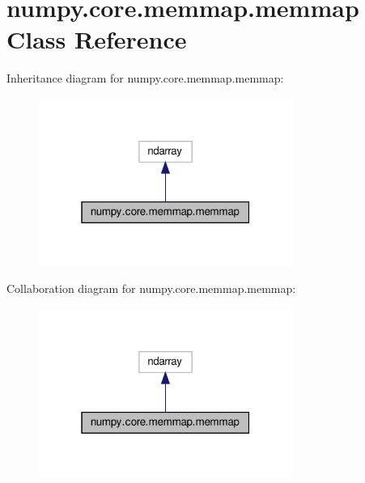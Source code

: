 \hypertarget{classnumpy_1_1core_1_1memmap_1_1memmap}{}\section{numpy.\+core.\+memmap.\+memmap Class Reference}
\label{classnumpy_1_1core_1_1memmap_1_1memmap}


Inheritance diagram for numpy.\+core.\+memmap.\+memmap\+:
\nopagebreak
\begin{figure}[H]
\begin{center}
\leavevmode
\includegraphics[width=235pt]{classnumpy_1_1core_1_1memmap_1_1memmap__inherit__graph}
\end{center}
\end{figure}


Collaboration diagram for numpy.\+core.\+memmap.\+memmap\+:
\nopagebreak
\begin{figure}[H]
\begin{center}
\leavevmode
\includegraphics[width=235pt]{classnumpy_1_1core_1_1memmap_1_1memmap__coll__graph}
\end{center}
\end{figure}
